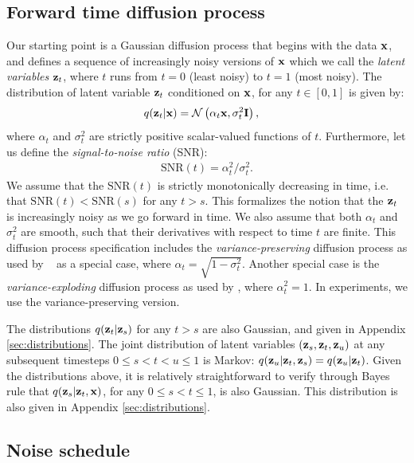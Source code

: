 \documentclass{article}
\newcommand{\snr}{\text{SNR}}
\begin{document}
\subsection{Forward time diffusion process}\label{sec:inferencemodel}
Our starting point is a Gaussian diffusion process that begins with the data ${\mathbf{x}}$, and defines a sequence of increasingly noisy versions of ${\mathbf{x}}$ which we call the \emph{latent variables} ${\mathbf{z}}_t$, where $t$ runs from $t=0$ (least noisy) to $t=1$ (most noisy).
The distribution of latent variable ${\mathbf{z}}_t$ conditioned on ${\mathbf{x}}$, for any $t \in [0,1]$ is given by:
\begin{align}
q(\rvz_t|\rvx) &= \mathcal{N}\left(\alpha_t \rvx, \sigma^2_t \bfI\right),
%
%
\label{eq:zt_given_x}
\end{align}
where  $\alpha_t$ and $\sigma^{2}_t$ are strictly positive scalar-valued functions of $t$. Furthermore, let us define the \emph{signal-to-noise ratio} (SNR): \begin{align}
    \snr(t) = \alpha^2_t / \sigma^2_t.
\end{align}
We assume that the $\snr(t)$ is strictly monotonically decreasing in time, i.e. that $\snr(t) < \snr(s)$ for any $t > s$. This formalizes the notion that the ${\mathbf{z}}_t$ is increasingly noisy as we go forward in time. We also assume that both $\alpha_{t}$ and $\sigma^{2}_t$ are smooth, such that their derivatives with respect to time $t$ are finite.  This diffusion process specification includes the \emph{variance-preserving} diffusion process as used by ~\citep{sohl2015deep,ho2020denoising} as a special case, where $\alpha_t = \sqrt{1 - \sigma^2_t}$. Another special case is the \emph{variance-exploding} diffusion process as used by \citep{song2019generative,song2020score}, where $\alpha^2_t = 1$. In experiments, we use the variance-preserving version.

The distributions $q({\mathbf{z}}_t|{\mathbf{z}}_s)$ for any $t > s$ are also Gaussian, and given in Appendix \ref{sec:distributions}. The joint distribution of latent variables $({\mathbf{z}}_s, {\mathbf{z}}_t, {\mathbf{z}}_u)$ at any subsequent timesteps $0 \leq s < t < u \leq 1$ is Markov: $q({\mathbf{z}}_u | {\mathbf{z}}_t, {\mathbf{z}}_s) = q({\mathbf{z}}_u | {\mathbf{z}}_t)$. Given the distributions above, it is relatively straightforward to verify through Bayes rule that $q({\mathbf{z}}_s|{\mathbf{z}}_t,{\mathbf{x}})$, for any $0 \leq s < t \leq 1$, is also Gaussian. This distribution is also given in Appendix \ref{sec:distributions}. 

\subsection{Noise schedule}
\label{sec:learning_noise}
\end{document}
